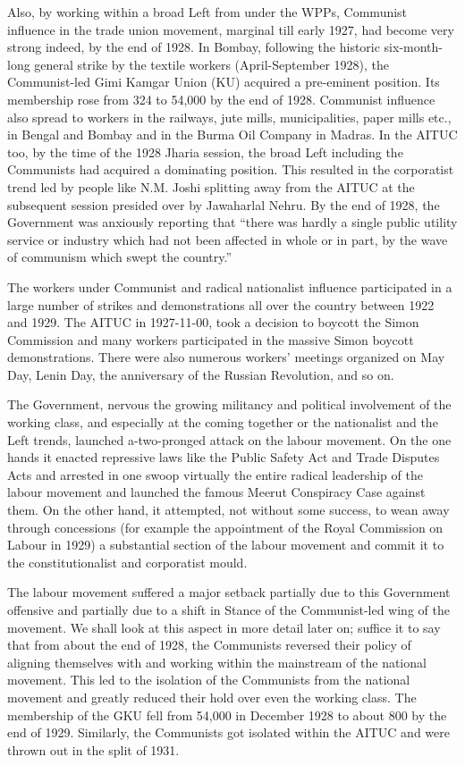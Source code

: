 \begin{multicols}{2}
Also, by working within a broad Left from under the WPPs, Communist influence in the trade union movement, marginal till early 1927, had become very strong indeed, by the end of 1928. In Bombay, following the historic six-month-long general strike by the textile workers (April-September 1928), the Communist-led Gimi Kamgar Union (KU) acquired a pre-eminent position. Its membership rose from 324 to 54,000 by the end of 1928. Communist influence also spread to workers in the railways, jute mills, municipalities, paper mills etc., in Bengal and Bombay and in the Burma Oil Company in Madras. In the AITUC too, by the time of the 1928 Jharia session, the broad Left including the Communists had acquired a dominating position. This resulted in the corporatist trend led by people like N.M. Joshi splitting away from the AITUC at the subsequent session presided over by Jawaharlal Nehru. By the end of 1928, the Government was anxiously reporting that ``there was hardly a single public utility service or industry which had not been affected in whole or in part, by the wave of communism which swept the country.''

The workers under Communist and radical nationalist influence participated in a large number of strikes and demonstrations all over the country between 1922 and 1929. The AITUC in 1927-11-00, took a decision to boycott the Simon Commission and many workers participated in the massive Simon boycott demonstrations. There were also numerous workers' meetings organized on May Day, Lenin Day, the anniversary of the Russian Revolution, and so on.

The Government, nervous the growing militancy and political involvement of the working class, and especially at the coming together or the nationalist and the Left trends, launched a-two-pronged attack on the labour movement. On the one hands it enacted repressive laws like the Public Safety Act and Trade Disputes Acts and arrested in one swoop virtually the entire radical leadership of the labour movement and launched the famous Meerut Conspiracy Case against them. On the other hand, it attempted, not without some success, to wean away through concessions (for example the appointment of the Royal Commission on Labour in 1929) a substantial section of the labour movement and commit it to the constitutionalist and corporatist mould.

The labour movement suffered a major setback partially due to this Government offensive and partially due to a shift in Stance of the Communist-led wing of the movement. We shall look at this aspect in more detail later on; suffice it to say that from about the end of 1928, the Communists reversed their policy of aligning themselves with and working within the mainstream of the national movement. This led to the isolation of the Communists from the national movement and greatly reduced their hold over even the working class. The membership of the GKU fell from 54,000 in December 1928 to about 800 by the end of 1929. Similarly, the Communists got isolated within the AITUC and were thrown out in the split of 1931.


\end{multicols}
